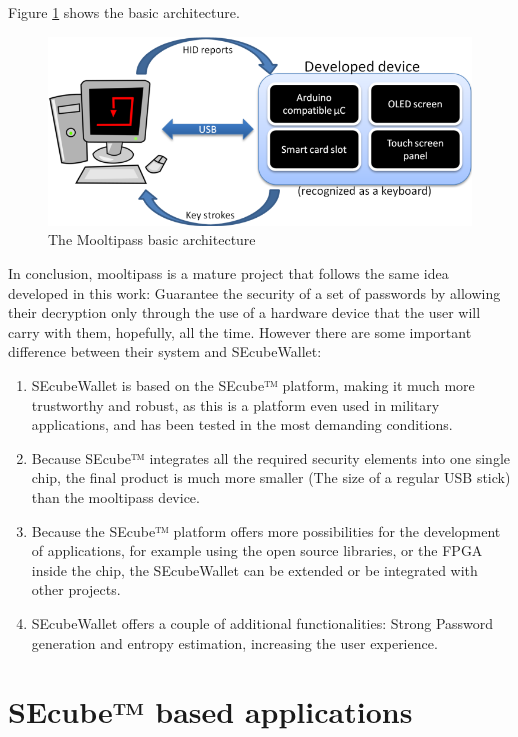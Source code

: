 Figure \ref{fig:mparchi} shows the basic architecture.
\begin{figure}[htb]
  \centering
  \captionsetup{justification=centering}
  \centerline{\includegraphics[width=0.9\columnwidth]{chapters/figures/related/mparchi.png}}
  \caption{The Mooltipass basic architecture}
  \label{fig:mparchi}
\end{figure}

In conclusion, mooltipass is a mature project that follows the same idea developed in this work: Guarantee the security of a set of passwords by allowing their decryption only through the use of a hardware device that the user will carry with them, hopefully, all the time. However there are some important difference between their system and SEcubeWallet:
\begin{enumerate}
\setlength\itemsep{-3pt}
\item SEcubeWallet is based on the SEcube™ platform, making it much more trustworthy and robust, as this is a platform even used in military applications, and has been tested in the most demanding conditions.

\item Because SEcube™ integrates all the required security elements into one single chip, the final product is much more smaller (The size of a regular USB stick) than the mooltipass device.

\item Because the SEcube™ platform offers more possibilities for the development of applications, for example using the open source libraries, or the FPGA inside the chip, the SEcubeWallet can be extended or be integrated with other projects.

\item SEcubeWallet offers a couple of additional functionalities: Strong Password generation and entropy estimation, increasing the user experience.
\end{enumerate}

\section{SEcube™ based applications} \label{sec:relsecube}

